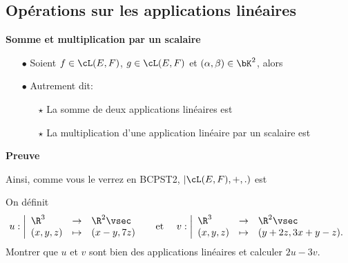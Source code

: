 \documentclass[a4paper, 11pt]{article}
\begin{document}
\vspace{0.5cm}

\subsection{Op\'erations sur les applications lin\'eaires}


\begin{prop} \textbf{Somme et multiplication par un scalaire}
\begin{itemize}
\item[$\bullet$] Soient $f\in\cL(E,F)$, $g\in\cL(E,F)$ et $(\alpha,\beta)\in\bK^2$, alors \dotfill\vsec
\item[$\bullet$] Autrement dit: \vsec
\begin{itemize}
\item[$\star$] La somme de deux applications lin\'eaires est \dotfill\vsec
\item[$\star$] La multiplication d'une application lin\'eaire par un scalaire est \dotfill\vsec
\end{itemize}
\end{itemize} 
\end{prop}
 

\textbf{Preuve}

\vspace{4cm}

\begin{rem}
Ainsi, comme vous le verrez en BCPST2, $\left| \cL(E,F), +,. \right)$ est \dotfill
\end{rem}

{\footnotesize \begin{exercice} 
On d\'efinit 
$$u: \left|\begin{array}{llllllll}
 \R^3 & \rightarrow & \R^2\vsec\\ 
    (x,y,z) & \mapsto &(x-y,7z) 
\end{array}\right. \quad \textmd{ et } \quad
v: \left|\begin{array}{llllllll}
  \R^3 & \rightarrow & \R^2\vsec\\
   (x,y,z) & \mapsto & (y+2z, 3x+y-z). 
\end{array}\right.$$
Montrer que $u$ et $v$ sont bien des applications lin\'eaires et calculer $2u-3v$.
\end{exercice}
}
 
\end{document}
